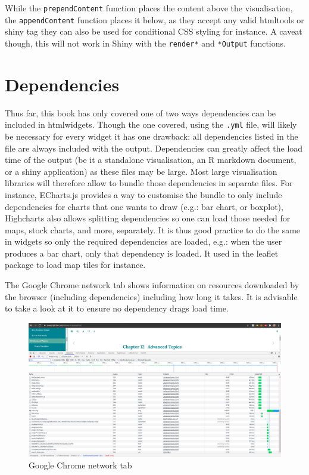 \documentclass[
]{krantz}
\begin{document}
While the \texttt{prependContent} function places the content above the visualisation, the \texttt{appendContent} function places it below, as they accept any valid htmltools or shiny tag they can also be used for conditional CSS styling for instance. A caveat though, this will not work in Shiny with the \texttt{render*} and \texttt{*Output} functions.

\hypertarget{dependencies-2}{%
\section*{Dependencies}\label{dependencies-2}}


Thus far, this book has only covered one of two ways dependencies can be included in htmlwidgets. Though the one covered, using the \texttt{.yml} file, will likely be necessary for every widget it has one drawback: all dependencies listed in the file are always included with the output. Dependencies can greatly affect the load time of the output (be it a standalone visualisation, an R markdown document, or a shiny application) as these files may be large. Most large visualisation libraries will therefore allow to bundle those dependencies in separate files. For instance, ECharts.js provides a way to customise the bundle to only include dependencies for charts that one wants to draw (e.g.: bar chart, or boxplot), Highcharts also allows splitting dependencies so one can load those needed for maps, stock charts, and more, separately. It is thus good practice to do the same in widgets so only the required dependencies are loaded, e.g.: when the user produces a bar chart, only that dependency is loaded. It used in the leaflet package to load map tiles for instance.

The Google Chrome network tab shows information on resources downloaded by the browser (including dependencies) including how long it takes. It is advisable to take a look at it to ensure no dependency drags load time.

\begin{figure}
\centering
\includegraphics{images/htmlwidgets-performances.png}
\caption{Google Chrome network tab}
\end{figure}
\end{document}
